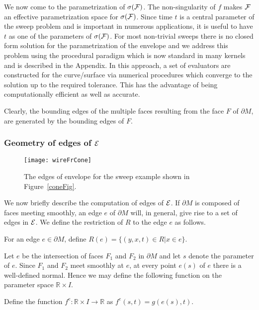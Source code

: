 \documentclass{elsart5p}
\begin{document}
We now come to the parametrization of $\sigma({\cal F})$.  The non-singularity of $f$ makes 
${\cal F}$ an effective parametrization space for $\sigma({\cal F})$.
Since time $t$ is a central parameter of the sweep problem and is important in 
numerous applications, it is useful to have $t$ as one of the parameters of $\sigma({\cal F})$.
For most non-trivial sweeps there is no closed form solution for the parametrization of 
the envelope and we address this problem using the procedural paradigm which is now 
standard in many kernels and is described in the Appendix.
In this approach, a set of evaluators are constructed for the 
curve/surface via numerical procedures  which converge to the solution up to the required tolerance.  
This has the advantage of being computationally efficient as well as accurate.

Clearly, the bounding edges of the multiple faces resulting from the
face $F$ of $\partial M$, are generated by the bounding edges of $F$.

\subsubsection{Geometry of edges of ${\cal E}$}
\begin{figure}
 \centering
 \texttt{[image: wireFrCone]}
 \caption{The edges of envelope for the sweep example shown in Figure~\ref{coneFig}.}
 \label{wireFrameFig}
\end{figure}


We now briefly describe the computation of edges of ${\cal E}$.  If $\partial M$ is 
composed of faces meeting smoothly, an edge $e$ of $\partial M$ will, in general, give rise to a 
set of edges in ${\cal E}$.
We define the restriction of $R$ to the edge $e$ as follows.
\begin{defn}
For an edge $e \in \partial M$, define $R(e) = \{ (y,x,t) \in R|x \in e \}$.
\end{defn}

Let $e$ be the intersection of faces $F_1$ and $F_2$ in $\partial M$ and let $s$ denote 
the parameter of $e$.  Since $F_1$ and $F_2$ meet smoothly at $e$, at every point 
$e(s)$ of $e$ there is a well-defined normal.  Hence we may define the following function 
on the parameter space $\mathbb{R} \times I$.

\begin{defn} \label{feDef}
Define the function $f^e: \mathbb{R} \times I \to \mathbb{R}$ as 
$f^e(s,t) = g(e(s),t)$.
\end{defn}
\end{document}
